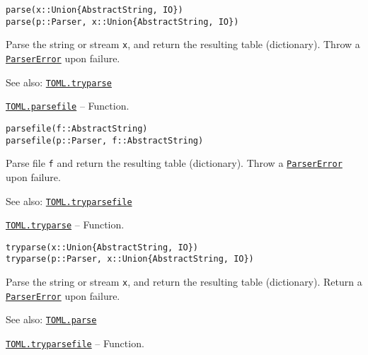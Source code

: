 \begin{adjustwidth}{2em}{0pt}


\begin{verbatim}
parse(x::Union{AbstractString, IO})
parse(p::Parser, x::Union{AbstractString, IO})
\end{verbatim}

Parse the string  or stream \texttt{x}, and return the resulting table (dictionary). Throw a \hyperlink{704017640374729671}{\texttt{ParserError}} upon failure.

See also: \hyperlink{16126470487745448226}{\texttt{TOML.tryparse}}



\end{adjustwidth}
\hypertarget{7810654945362887951}{}
\hyperlink{7810654945362887951}{\texttt{TOML.parsefile}}  -- {Function.}

\begin{adjustwidth}{2em}{0pt}


\begin{verbatim}
parsefile(f::AbstractString)
parsefile(p::Parser, f::AbstractString)
\end{verbatim}

Parse file \texttt{f} and return the resulting table (dictionary). Throw a \hyperlink{704017640374729671}{\texttt{ParserError}} upon failure.

See also: \hyperlink{1998506580442532282}{\texttt{TOML.tryparsefile}}



\end{adjustwidth}
\hypertarget{16126470487745448226}{}
\hyperlink{16126470487745448226}{\texttt{TOML.tryparse}}  -- {Function.}

\begin{adjustwidth}{2em}{0pt}


\begin{verbatim}
tryparse(x::Union{AbstractString, IO})
tryparse(p::Parser, x::Union{AbstractString, IO})
\end{verbatim}

Parse the string or stream \texttt{x}, and return the resulting table (dictionary). Return a \hyperlink{704017640374729671}{\texttt{ParserError}} upon failure.

See also: \hyperlink{12167785999563676987}{\texttt{TOML.parse}}



\end{adjustwidth}
\hypertarget{1998506580442532282}{}
\hyperlink{1998506580442532282}{\texttt{TOML.tryparsefile}}  -- {Function.}

